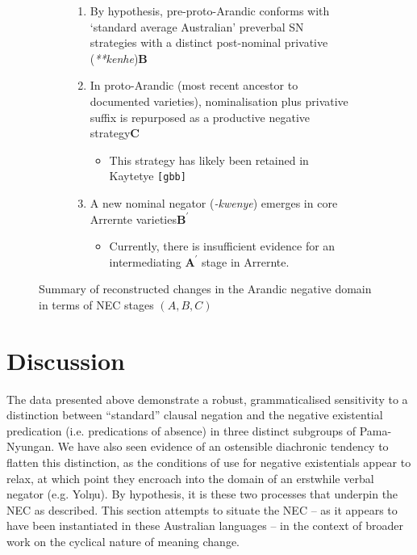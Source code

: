 \documentclass[output=paper]{langsci/langscibook}
\begin{document}
\noindent\begin{figure}
    \begin{subfigure}{.4\textwidth}
\end{subfigure}
    \begin{subfigure}{.58\textwidth}
	\begin{enumerate}[label={\textbf{\roman*})}]%
		\item By hypothesis, pre-proto-Arandic conforms with `standard average Australian' preverbal SN strategies with a distinct post-nominal privative (\textit{**kenhe})\hfill $\boldsymbol B$ 
		\item In proto-Arandic (most recent ancestor to documented varieties), nominalisation plus privative suffix is repurposed as a productive negative strategy\hfill$\boldsymbol C$
		\begin{itemize}
			\item This strategy has likely been retained in Kaytetye \texttt{[gbb]}
		\end{itemize}
		\item A new nominal negator (\textit{-kwenye}) emerges in core Arrernte varieties\hfill$\boldsymbol{B^\prime}$
		\begin{itemize}
			\item Currently, there is insufficient evidence for an intermediating $\boldsymbol{A^\prime}$ stage in Arrernte.
		\end{itemize}	
	\end{enumerate}
    \end{subfigure}
	\caption{Summary of reconstructed changes in the Arandic negative domain in terms of NEC stages $ (A,B,C) $}\label{fig:austr-arandic}
\end{figure}

\section{Discussion}\label{sec:austr-6}

The data presented above demonstrate a robust, grammaticalised sensitivity to a distinction between ``standard'' clausal negation and the negative existential predication (i.e. predications of absence) in three distinct subgroups of Pama-Nyungan. We have also seen evidence of an ostensible diachronic tendency to flatten this distinction, as the conditions of use for negative existentials appear to relax, at which point they encroach into the domain of an erstwhile verbal negator (e.g. Yolŋu). By hypothesis, it is these two processes that underpin the NEC as described. This section attempts to situate the NEC -- as it appears to have been instantiated in these Australian languages -- in the context of broader work on the cyclical nature of meaning change.
\end{document}
